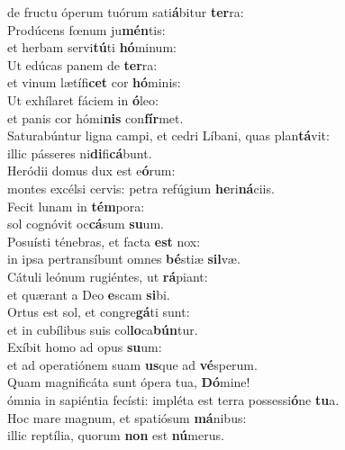 \evenverse de fructu óperum tuórum sati\textbf{á}bitur \textbf{ter}ra:\\
\oddverse Prodúcens fœnum ju\textbf{mén}tis:~\*\\
\oddverse et herbam servi\textbf{tú}ti \textbf{hó}minum:\\
\evenverse Ut edúcas panem de \textbf{ter}ra:~\*\\
\evenverse et vinum lætífi\textbf{cet} cor \textbf{hó}minis:\\
\oddverse Ut exhílaret fáciem in \textbf{ó}leo:~\*\\
\oddverse et panis cor hómi\textbf{nis} con\textbf{fír}met.\\
\evenverse Saturabúntur ligna campi, et cedri Líbani, quas plan\textbf{tá}vit:~\*\\
\evenverse illic pásseres ni\textbf{di}fi\textbf{cá}bunt.\\
\oddverse Heródii domus dux est e\textbf{ó}rum:~\*\\
\oddverse montes excélsi cervis: petra refúgium \textbf{he}ri\textbf{ná}ciis.\\
\evenverse Fecit lunam in \textbf{tém}pora:~\*\\
\evenverse sol cognóvit oc\textbf{cá}sum \textbf{su}um.\\
\oddverse Posuísti ténebras, et facta \textbf{est} nox:~\*\\
\oddverse in ipsa pertransíbunt omnes \textbf{bé}stiæ \textbf{sil}væ.\\
\evenverse Cátuli leónum rugiéntes, ut \textbf{rá}piant:~\*\\
\evenverse et quærant a Deo \textbf{e}scam \textbf{si}bi.\\
\oddverse Ortus est sol, et congre\textbf{gá}ti sunt:~\*\\
\oddverse et in cubílibus suis col\textbf{lo}ca\textbf{bún}tur.\\
\evenverse Exíbit homo ad opus \textbf{su}um:~\*\\
\evenverse et ad operatiónem suam \textbf{us}que ad \textbf{vé}sperum.\\
\oddverse Quam magnificáta sunt ópera tua, \textbf{Dó}mine!~\*\\
\oddverse ómnia in sapiéntia fecísti: impléta est terra possessi\textbf{ó}ne \textbf{tu}a.\\
\evenverse Hoc mare magnum, et spatiósum \textbf{má}nibus:~\*\\
\evenverse illic reptília, quorum \textbf{non} est \textbf{nú}merus.\\
